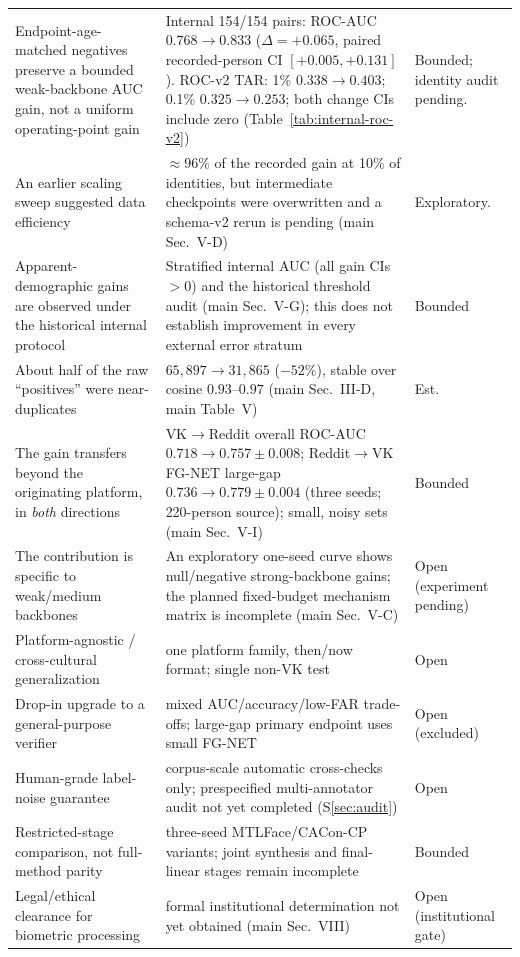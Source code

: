 \documentclass[journal]{IEEEtran}
\newcommand{\mainsec}[1]{main Sec.~#1}
\newcommand{\maintab}[1]{main Table~#1}
\begin{document}
\begin{table}[!t]
\begin{tabular}{@{}p{}p{}p{}@{}}
Endpoint-age-matched negatives preserve a bounded weak-backbone AUC gain, not a uniform operating-point gain &
Internal 154/154 pairs: ROC-AUC $0.768\!\to\!0.833$ ($\Delta=+0.065$, paired recorded-person CI $[+0.005,+0.131]$). ROC-v2 TAR: 1\% $0.338\!\to\!0.403$; 0.1\% $0.325\!\to\!0.253$; both change CIs include zero (Table~\ref{tab:internal-roc-v2}) & Bounded; identity audit pending. \\
An earlier scaling sweep suggested data efficiency &
${\approx}96\%$ of the recorded gain at 10\% of identities, but intermediate checkpoints were overwritten and a schema-v2 rerun is pending (\mainsec{V-D}) & Exploratory. \\
Apparent-demographic gains are observed under the historical internal protocol &
Stratified internal AUC (all gain CIs $>0$) and the historical threshold audit (\mainsec{V-G}); this does not establish improvement in every external error stratum & Bounded \\
About half of the raw ``positives'' were near-duplicates &
$65{,}897\!\to\!31{,}865$ ($-52\%$), stable over cosine $0.93$--$0.97$ (\mainsec{III-D}, \maintab{V}) & Est. \\
The gain transfers beyond the originating platform, in \emph{both} directions &
VK$\to$Reddit overall ROC-AUC $0.718\!\to\!0.757{\pm}0.008$; Reddit$\to$VK FG-NET large-gap $0.736\!\to\!0.779{\pm}0.004$ (three seeds; 220-person source); small, noisy sets (\mainsec{V-I}) & Bounded \\
The contribution is specific to weak/medium backbones &
An exploratory one-seed curve shows null/negative strong-backbone gains; the planned fixed-budget mechanism matrix is incomplete (\mainsec{V-C}) & Open (experiment pending) \\
Platform-agnostic / cross-cultural generalization & one platform family, then/now format; single non-VK test & Open \\
Drop-in upgrade to a general-purpose verifier & mixed AUC/accuracy/low-FAR trade-offs; large-gap primary endpoint uses small FG-NET & Open (excluded) \\
Human-grade label-noise guarantee & corpus-scale automatic cross-checks only; prespecified multi-annotator audit not yet completed (S\ref{sec:audit}) & Open \\
Restricted-stage comparison, not full-method parity & three-seed MTLFace/CACon-CP variants; joint synthesis and final-linear stages remain incomplete & Bounded \\
Legal/ethical clearance for biometric processing & formal institutional determination not yet obtained (\mainsec{VIII}) & Open (institutional gate) \\
\bottomrule
\end{tabular}
\end{table}
\end{document}
